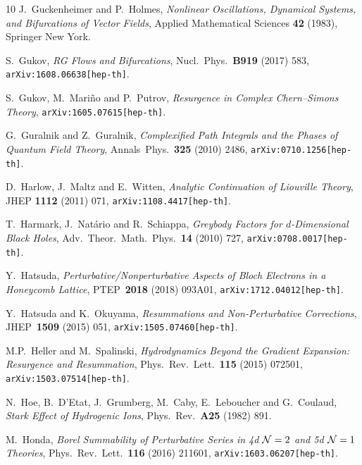 \documentclass[11pt,a4paper]{article}
\newcommand{\CN}{{\cal N}}
\begin{document}
\begin{thebibliography}{10}
J.~Guckenheimer and P.~Holmes,
\textit{Nonlinear Oscillations, Dynamical Systems, and Bifurcations of Vector Fields},
Applied Mathematical Sciences \textbf{42} (1983), Springer New York.

S.~Gukov,
\textit{RG Flows and Bifurcations},
Nucl.\ Phys.\ \textbf{B919} (2017) 583,
\texttt{arXiv:1608.06638[hep-th]}.

S.~Gukov, M.~Mari\~no and P.~Putrov,
\textit{Resurgence in Complex Chern--Simons Theory},
\texttt{arXiv:1605.07615[hep-th]}.

G.~Guralnik and Z.~Guralnik,
\textit{Complexified Path Integrals and the Phases of Quantum Field Theory},
Annals\ Phys.\ \textbf{325} (2010) 2486,
\texttt{arXiv:0710.1256[hep-th]}.

D.~Harlow, J.~Maltz and E.~Witten,
\textit{Analytic Continuation of Liouville Theory},
JHEP \textbf{1112} (2011) 071,
\texttt{arXiv:1108.4417[hep-th]}.

T.~Harmark, J.~Nat\'ario and R.~Schiappa,
\textit{Greybody Factors for $d$-Dimensional Black Holes},
Adv.\ Theor.\ Math.\ Phys.\ \textbf{14} (2010) 727,
\texttt{arXiv:0708.0017[hep-th]}.

Y.~Hatsuda,
\textit{Perturbative/Nonperturbative Aspects of Bloch Electrons in a Honeycomb Lattice},
PTEP\ \textbf{2018} (2018) 093A01,
\texttt{arXiv:1712.04012[hep-th]}.

Y.~Hatsuda and K.~Okuyama,
\textit{Resummations and Non-Perturbative Corrections},
JHEP\ \textbf{1509} (2015) 051,
\texttt{arXiv:1505.07460[hep-th]}.

M.P.~Heller and M.~Spalinski,
\textit{Hydrodynamics Beyond the Gradient Expansion: Resurgence and Resummation},
Phys.\ Rev.\ Lett.\ \textbf{115} (2015) 072501,
\texttt{arXiv:1503.07514[hep-th]}.

N.~Hoe, B.~D'Etat, J.~Grumberg, M.~Caby, E.~Leboucher and G.~Coulaud,
\textit{Stark Effect of Hydrogenic Ions},
Phys.\ Rev.\ \textbf{A25} (1982) 891.

M.~Honda,
\textit{Borel Summability of Perturbative Series in 4d $\CN=\text{2}$ and 5d $\CN=\text{1}$ Theories},
Phys.\ Rev.\ Lett.\ \textbf{116} (2016) 211601,
\texttt{arXiv:1603.06207[hep-th]}.


\end{thebibliography}
\end{document}
